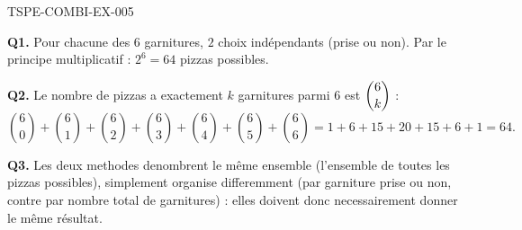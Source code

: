 \begin{corrige}{TSPE-COMBI-EX-005}

\textbf{Q1.} Pour chacune des $6$ garnitures, $2$ choix indépendants (prise ou non). Par le principe multiplicatif : $2^6 = \boxed{64}$ pizzas possibles.

\textbf{Q2.} Le nombre de pizzas a exactement $k$ garnitures parmi $6$ est $\dbinom{6}{k}$ :
\[
  \binom{6}{0}+\binom{6}{1}+\binom{6}{2}+\binom{6}{3}+\binom{6}{4}+\binom{6}{5}+\binom{6}{6} = 1+6+15+20+15+6+1 = 64.
\]

\textbf{Q3.} Les deux methodes denombrent le même ensemble (l'ensemble de toutes les pizzas possibles), simplement organise differemment (par garniture prise ou non, contre par nombre total de garnitures) : elles doivent donc necessairement donner le même résultat.

\end{corrige}
